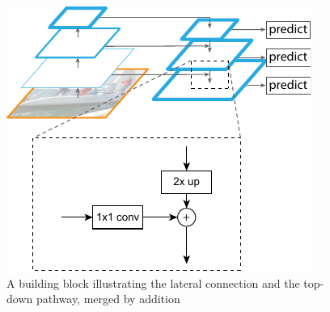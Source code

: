\begin{figure}[h]
    \centering
    \includegraphics[]{images/fpn-lateral.pdf}
    \caption{A building block illustrating the lateral connection and
    the top-down pathway, merged by addition \cite{lin2017fpn}}
    \label{fig:fpn-lateral}
\end{figure}
